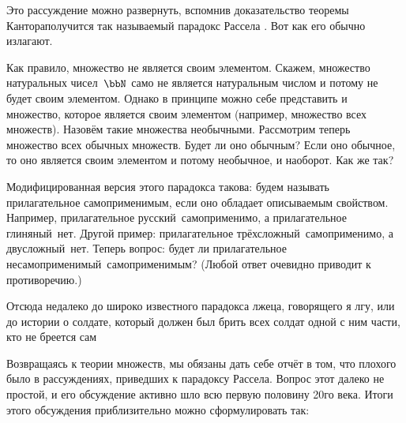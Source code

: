 Это рассуждение можно развернуть, вспомнив доказательство
теоремы Кантора\т получится так называемый парадокс Рассела%
. Вот
как его обычно излагают.

        \label{russell-paradox}
Как правило, множество не является своим
элементом. Скажем, множество натуральных чисел~$\bbN$
само не является натуральным числом и потому не будет своим
элементом. Однако в принципе можно себе представить и
множество, которое является своим элементом (например, множество
всех множеств). Назовём такие множества  необычными.
Рассмотрим теперь множество всех обычных множеств. Будет
ли оно обычным? Если оно обычное, то оно является своим
элементом и потому необычное, и наоборот. Как же так?

Модифицированная версия этого парадокса такова: будем называть
прилагательное самоприменимым, если оно об\-ла\-да\-ет описываемым
свойством. Например, при\-ла\-га\-тель\-ное  русский\
самоприменимо, а прилагательное  глиняный\ нет. Другой
пример: прилагательное \лк трёх\-слож\-ный\пк\ самоприменимо, а 
двусложный\ нет. Теперь вопрос: будет ли прилагательное \лк
несамоприменимый\пк\ самоприменимым? (Любой ответ очевидно
приводит к противоречию.)

Отсюда недалеко до широко известного  парадокса
лжеца,
говорящего \лк я лгу\пк, или до истории о солдате, который
должен был брить всех солдат одной с ним части, кто не бреется
сам 

Возвращаясь к теории множеств, мы обязаны дать себе отчёт
в том, что плохого было в рассуждениях, приведших к парадоксу
Рассела. Вопрос этот далеко не простой, и его обсуждение
активно шло всю первую половину 20\д го века. Итоги этого обсуждения
приблизительно можно сформулировать так:

